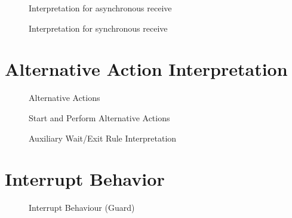 \begin{figure}[ph]
	\centering
	\caption[Interpretation for asynchronous send]{Interpretation for asynchronous receive}
	\label{fig:asm-async-receive}
\end{figure}

\begin{figure}
	\centering
	\caption[Interpretation for asynchronous send]{Interpretation for synchronous receive}
	\label{fig:asm-sync-receive}
\end{figure}

%
%
\newpage
\section{Alternative Action Interpretation}
%
\begin{figure}[ph]
	\centering
	\caption[Alternative Actions]{Alternative Actions}
	\label{fig:asm-alternative-action}
\end{figure}
%
\begin{figure}
	\centering
	\caption[Start and Perform Alternative Actions]{Start and Perform Alternative Actions}
	\label{fig:asm-alt-actions-perform}
\end{figure}
%
\begin{figure}
	\centering
	\caption[Auxiliary Wait/Exit Rule Interpretation]{Auxiliary Wait/Exit Rule Interpretation}
	\label{fig:asm-alternative-action}
\end{figure}
%
%
%
\newpage
\section{Interrupt Behavior}
\begin{figure}[ph]
	\centering
	\caption[Interrupt-Behaviour]{Interrupt Behaviour (Guard)}
	\label{fig:ASM-Interrupt-Behaviour}
\end{figure}
